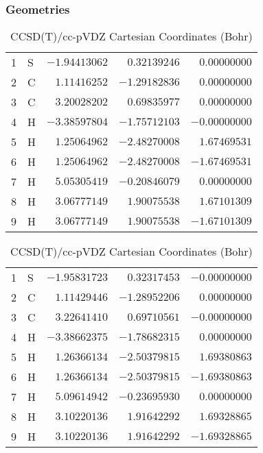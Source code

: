 \documentclass[10pt,oneside]{article}
\begin{document}
\begin{table}[h!]
\subsubsection*{Geometries}
\begin{multicols}{2}
\centering
\caption{CCSD(T)/cc-pVTZ Cartesian Coordinates (Bohr)}
\begin{tabular}{llrrr}
\toprule
1  & S  & $-1.94413062$ & $ 0.32139246$ & $ 0.00000000$ \\
2  & C  & $ 1.11416252$ & $-1.29182836$ & $ 0.00000000$ \\
3  & C  & $ 3.20028202$ & $ 0.69835977$ & $ 0.00000000$ \\
4  & H  & $-3.38597804$ & $-1.75712103$ & $-0.00000000$ \\
5  & H  & $ 1.25064962$ & $-2.48270008$ & $ 1.67469531$ \\
6  & H  & $ 1.25064962$ & $-2.48270008$ & $-1.67469531$ \\
7  & H  & $ 5.05305419$ & $-0.20846079$ & $ 0.00000000$ \\
8  & H  & $ 3.06777149$ & $ 1.90075538$ & $ 1.67101309$ \\
9  & H  & $ 3.06777149$ & $ 1.90075538$ & $-1.67101309$ \\
\bottomrule
\end{tabular}
\caption{CCSD(T)/cc-pVDZ Cartesian Coordinates (Bohr)}
\begin{tabular}{llrrr}
\toprule
1  & S  & $-1.95831723$ & $ 0.32317453$ & $-0.00000000$ \\
2  & C  & $ 1.11429446$ & $-1.28952206$ & $ 0.00000000$ \\
3  & C  & $ 3.22641410$ & $ 0.69710561$ & $-0.00000000$ \\
4  & H  & $-3.38662375$ & $-1.78682315$ & $ 0.00000000$ \\
5  & H  & $ 1.26366134$ & $-2.50379815$ & $ 1.69380863$ \\
6  & H  & $ 1.26366134$ & $-2.50379815$ & $-1.69380863$ \\
7  & H  & $ 5.09614942$ & $-0.23695930$ & $ 0.00000000$ \\
8  & H  & $ 3.10220136$ & $ 1.91642292$ & $ 1.69328865$ \\
9  & H  & $ 3.10220136$ & $ 1.91642292$ & $-1.69328865$ \\
\bottomrule
\end{tabular}
\end{multicols}
\end{table}
\end{document}
